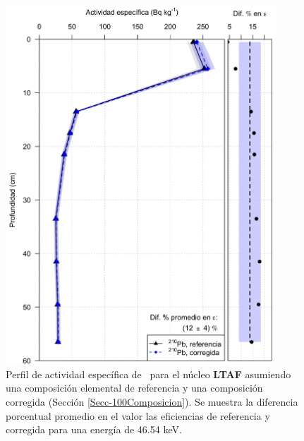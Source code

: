 \begin{figure}
\centering
\includegraphics[width=0.9\textwidth]{Imagenes/Act_210Pb_Agua_Composicion_LTAF.png}
\caption{Perfil de actividad específica de \PbCero\, para el núcleo \textbf{LTAF} asumiendo una composición elemental de referencia y una composición corregida (Sección \ref{Secc-100Composicion}). Se muestra la diferencia porcentual promedio en el valor las eficiencias de referencia y corregida para una energía de 46.54 keV.}\label{FigLTAFAgua}
\end{figure}
